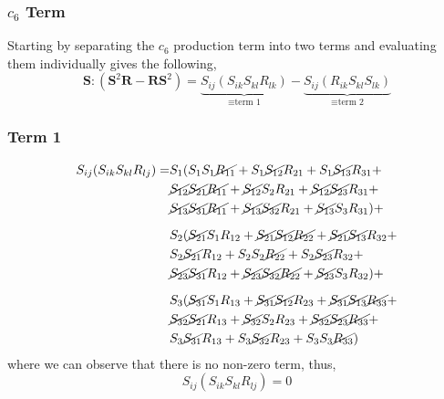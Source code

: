 \subsubsection{$c_{6}$ Term}
Starting by separating the $c_{6}$ production term into two terms
and evaluating them individually gives the following,
\begin{equation}
    \mathbf{S}:(\mathbf{S}^2\mathbf{R} - \mathbf{RS}^2) =
        \underbrace{S_{ij}(S_{ik}S_{kl}R_{lk})}_{\equiv \text{term 1}}
        -\underbrace{S_{ij}(R_{ik}S_{kl}S_{lk})}_{\equiv \text{term 2}}
\end{equation}
\subsubsection{Term 1}
\begin{equation}
    \begin{split}
        S_{ij}(S_{ik}S_{kl}R_{lj}) = & 
            S_{1}(
            S_{1}S_{1}\cancel{R_{11}} + S_{1}\cancel{S_{12}}R_{21} + S_{1}\cancel{S_{13}}R_{31} +   \\
        &   \cancel{S_{12}}\cancel{S_{21}}\cancel{R_{11}} + \cancel{S_{12}}S_{2}R_{21} + \cancel{S_{12}}\cancel{S_{23}}R_{31} +   \\
        &   \cancel{S_{13}}\cancel{S_{31}}\cancel{R_{11}} + \cancel{S_{13}}\cancel{S_{32}}R_{21} + \cancel{S_{13}}S_{3}R_{31} 
            ) +   \\[6pt]
        &   S_{2}(
            \cancel{S_{21}}S_{1}R_{12} + \cancel{S_{21}}\cancel{S_{12}}\cancel{R_{22}} + \cancel{S_{21}}\cancel{S_{13}}R_{32} +   \\
        &   S_{2}\cancel{S_{21}}R_{12} + S_{2}S_{2}\cancel{R_{22}} + S_{2}\cancel{S_{23}}R_{32} +   \\
        &   \cancel{S_{23}}\cancel{S_{31}}R_{12} + \cancel{S_{23}}\cancel{S_{32}}\cancel{R_{22}} + \cancel{S_{23}}S_{3}R_{32} 
            ) +   \\[6pt]
        &   S_{3}(
            \cancel{S_{31}}S_{1}R_{13} + \cancel{S_{31}}\cancel{S_{12}}R_{23} + \cancel{S_{31}}\cancel{S_{13}}\cancel{R_{33}} +   \\
        &   \cancel{S_{32}}\cancel{S_{21}}R_{13} + \cancel{S_{32}}S_{2}R_{23} + \cancel{S_{32}}\cancel{S_{23}}\cancel{R_{33}} +   \\
        &   S_{3}\cancel{S_{31}}R_{13} + S_{3}\cancel{S_{32}}R_{23} + S_{3}S_{3}\cancel{R_{33}} )
    \end{split}
\end{equation}
where we can observe that there is no non-zero term, thus,
\begin{equation}
        S_{ij}(S_{ik}S_{kl}R_{lj}) = 0
\end{equation}
